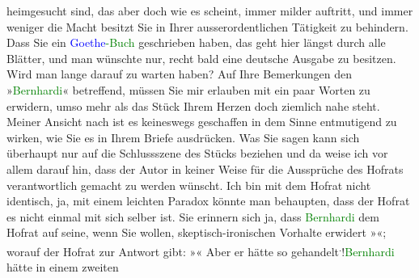                heimgesucht sind, das aber doch wie es scheint, immer milder auftritt, und immer
               weniger die Macht besitzt Sie in Ihrer ausserordentlichen Tätigkeit zu behindern.
               Dass Sie ein \textcolor{green}{\textcolor{blue}{Goethe}{}\ledrightnote{\textcolor{blue}{Johann Wolfgang von Goethe}}-Buch}{}\ledrightnote{\textcolor{green}{Wolfgang Goethe}} geschrieben haben, das geht
               hier längst durch alle Blätter, und man wünschte nur, recht bald eine deutsche
               Ausgabe zu besitzen. Wird man lange darauf zu warten haben?\pend
           \pstart
           Auf Ihre Bemerkungen den »\textcolor{green}{Bernhardi}{}\ledrightnote{\textcolor{green}{Professor Bernhardi. Komödie in fünf Akten}}« betreffend,
               müssen Sie mir erlauben mit ein paar Worten zu erwidern, umso mehr als das Stück
               Ihrem Herzen doch ziemlich nahe steht. Meiner Ansicht nach ist es keineswegs
               geschaffen in {\pb}dem Sinne entmutigend zu wirken,
               wie Sie es in Ihrem Briefe ausdrücken. Was Sie sagen kann sich überhaupt nur auf die
               Schlussszene des Stücks beziehen und da weise ich vor allem darauf hin, dass der
               Autor in keiner Weise für die Aussprüche des Hofrats verantwortlich gemacht zu werden
               wünscht. Ich bin mit dem Hofrat nicht identisch, ja, mit einem leichten Paradox
               könnte man behaupten, dass der Hofrat es nicht einmal mit sich selber ist. Sie
               erinnern sich ja, dass \textcolor{green}{Bernhardi}{}
               dem Hofrat auf seine, wenn Sie wollen, skeptisch-ironischen Vorhalte erwidert \introOben{}»\introOben{}\label{K_L02222_1v}\label{K_L02222_1h}\introOben{}«\introOben{}; worauf der Hofrat zur Antwort gibt: »\label{K_L02222_2v}\label{K_L02222_2h}« Aber er hätte so gehandelt\substVorne{}\textsuperscript{.}\substDazwischen{}!\substHinten{}{ }\textcolor{green}{Bernhardi}{} hätte in einem zweiten

